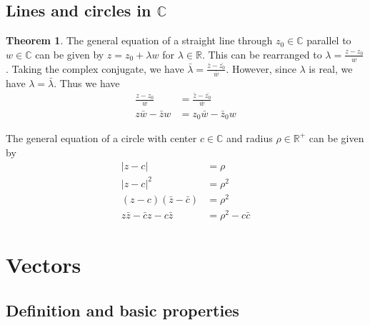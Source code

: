 \documentclass[a4paper]{article}
\theoremstyle{definition}
\newtheorem*{thm}{Theorem}
\newcommand{\R}{\mathbb{R}}
\newcommand{\C}{\mathbb{C}}
\let\stdsection\section
\renewcommand\section{\newpage\stdsection}
\begin{document}
\subsection{Lines and circles in \texorpdfstring{$\C$}{C}}
\begin{thm}
The general equation of a straight line through $z_0\in \C$ parallel to $w\in \C$ can be given by $z = z_0 + \lambda w$ for $\lambda \in \R$. This can be rearranged to $\lambda = \frac{z - z_0}{w}$. Taking the complex conjugate, we have $\bar{\lambda} = \frac{\bar{z} - \bar{z_0}}{\bar{w}}$. However, since $\lambda$ is real, we have $\lambda = \bar{\lambda}$. Thus we have
\begin{align*}
  \frac{z - z_0}{w} &= \frac{\bar{z} - \bar{z_0}}{\bar{w}}\\
  z\bar w - \bar z w &= z_0 \bar w - \bar z_0 w
\end{align*}

The general equation of a circle with center $c\in \C$ and radius $\rho \in \R^+$ can be given by
\begin{align*}
  |z - c| &= \rho\\
  |z - c|^2 &= \rho^2\\
  (z - c)(\bar z - \bar c) &= \rho^2\\
  z\bar z - \bar c z - c\bar z &= \rho^2 - c\bar c
\end{align*}
\end{thm}
\section{Vectors}
\subsection{Definition and basic properties}
\end{document}
